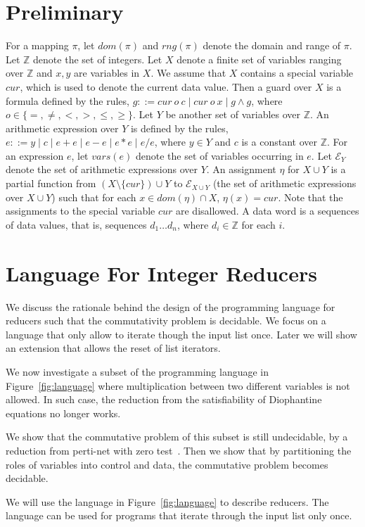\documentclass[runningheads,a4paper]{llncs}
\def\Ee{{\mathcal{E} }}
\def\Ii{{\mathbb{Z} }}
\begin{document}
\section{Preliminary}
For a mapping $\pi$, let $dom(\pi)$ and $rng(\pi)$ denote the domain and range of $\pi$.
Let $\Ii$ denote the set of integers. Let $X$ denote a finite set of variables ranging over $\Ii$ and $x,y$ are variables in $X$. We assume that $X$ contains a special variable $cur$, which is used to denote the current data value. Then a guard over $X$ is a formula defined by the rules, $g::= cur\ o\ c \mid cur\ o\ x \mid g \wedge g$, where $o \in \{=,\neq,<, >, \le, \ge\}$. Let $Y$ be another set of variables over $\Ii$. An arithmetic expression over $Y$ is defined by the rules, $e::= y \mid c \mid e + e \mid e-e \mid e * e \mid e / e$, where $y \in Y$ and $c$ is a constant over $\Ii$. For an expression $e$, let $vars(e)$ denote the set of variables occurring in $e$. Let $\Ee_Y$ denote the set of arithmetic expressions over $Y$. An assignment $\eta$ for $X \cup Y$ is a partial function from $(X \setminus \{cur\}) \cup Y$ to $\Ee_{X \cup Y}$ (the set of arithmetic expressions over $X \cup Y$) such that for each $x \in dom(\eta) \cap X$, $\eta(x)=cur$. Note that the assignments to the special variable $cur$ are disallowed.
A data word is a sequences of data values, that is, sequences $d_1\dots d_n$, where $d_i \in \Ii$ for each $i$.

\section{Language For Integer Reducers}
We discuss the rationale behind the design of the programming language for reducers such that the commutativity problem is decidable.
We focus on a language that only allow to iterate though the input list once. Later we will show an extension that allows the reset of list iterators.

We now investigate a subset of the programming language in Figure~\ref{fig:language} where multiplication between two different variables is not allowed. In such case, the reduction from the satisfiability of Diophantine equations no longer works. 


We show that the commutative problem of this subset is still undecidable, by a reduction from perti-net with zero test~\cite{petri}. Then we show that by partitioning the roles of variables into control and data, the commutative problem becomes decidable.

We will use the language in Figure~\ref{fig:language} to describe reducers. The language can be used for programs that iterate through the input list only once. 
\end{document}
